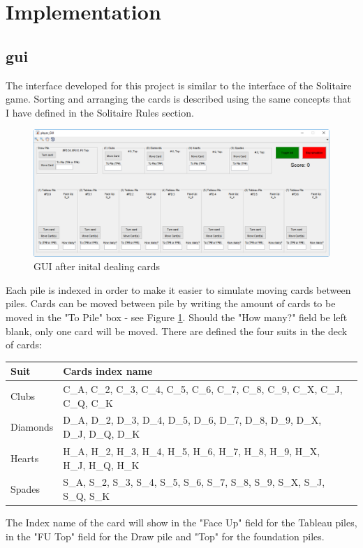 \documentclass[runningheads,a4paper]{llncs}
\begin{document}
\section{Implementation}
\label{sec:gui_init}
\subsection{\ac{gui}}
The interface developed for this project is similar to the interface of the Solitaire game.
Sorting and arranging the cards is described using the same concepts that I have defined in the Solitaire Rules section.
\begin{figure}
	\begin{center}
		\includegraphics[width=\textwidth]{images/dealinit}
		\caption{GUI after inital dealing cards}
		\label{fig:gui_init}
	\end{center}
\end{figure}
\newline

Each pile is indexed in order to make it easier to simulate moving cards between piles. Cards can be moved between pile by writing the amount of cards to be moved in the "To Pile" box - see Figure \ref{fig:gui_init}.
\newline
Should the "How many?" field be left blank, only one card will be moved.
There are defined the four suits in the deck of cards:
\begin{center}
	\begin{tabular}{ | l | l | l | }
		\hline
		Suit & Cards index name \\ \hline
		Clubs & C\_A, C\_2, C\_3, C\_4, C\_5, C\_6, C\_7, C\_8, C\_9, C\_X, C\_J, C\_Q, C\_K  \\ \hline
		Diamonds & D\_A, D\_2, D\_3, D\_4, D\_5, D\_6, D\_7, D\_8, D\_9, D\_X, D\_J, D\_Q, D\_K \\ \hline
		Hearts & H\_A, H\_2, H\_3, H\_4, H\_5, H\_6, H\_7, H\_8, H\_9, H\_X, H\_J, H\_Q, H\_K  \\ \hline
		Spades & S\_A,  S\_2, S\_3,  S\_4, S\_5,  S\_6, S\_7,  S\_8, S\_9,  S\_X, S\_J, S\_Q,  S\_K \\ \hline
	\end{tabular}
\end{center}
The Index name of the card will show in the "Face Up" field for the Tableau piles, in the "FU Top" field for the Draw pile and "Top" for the foundation piles.
\end{document}
